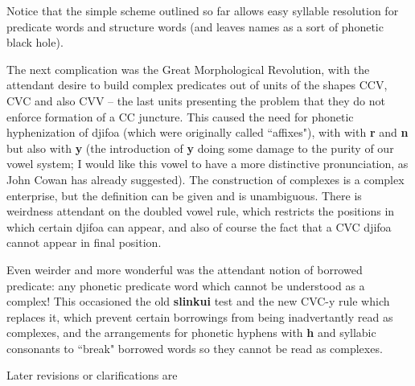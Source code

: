 \documentclass[12pt]{book}
\begin{document}
Notice that the simple scheme outlined so far allows easy syllable resolution for predicate words and structure words (and leaves names as a sort of phonetic black hole).

The next complication was the Great Morphological Revolution, with the attendant desire to build complex predicates out of units of the shapes CCV, CVC and also CVV -- the last units presenting the problem that they do not enforce formation of a CC juncture.  This caused the need for phonetic hyphenization of djifoa (which were originally called ``affixes"), with
with {\bf r} and {\bf n} but also with {\bf y} (the introduction of {\bf y} doing some damage to the purity of our vowel system;  I would like this vowel to have a more distinctive pronunciation, as John Cowan has already suggested).  The construction of complexes is a complex enterprise, but the definition can be given and is unambiguous.  There is weirdness attendant on
the doubled vowel rule, which restricts the positions in which certain djifoa can appear, and also of course the fact that a CVC djifoa cannot appear in final position.

Even weirder and more wonderful was the attendant notion of borrowed predicate:  any phonetic predicate word which cannot be understood as a complex!  This occasioned the old
{\bf slinkui} test and the new CVC-y rule which replaces it, which prevent certain borrowings from being inadvertantly read as complexes, and the arrangements for phonetic hyphens
with {\bf h} and syllabic consonants to ``break"  borrowed words so they cannot be read as complexes.

Later revisions or clarifications are
\end{document}
